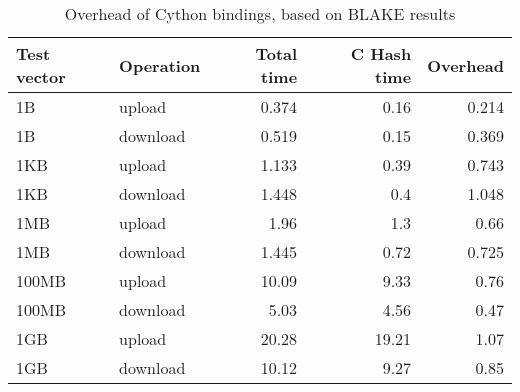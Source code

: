 \begin{table}
  \centering
  \begin{tabular}{ | l | l | r | r | r |}
    \hline
    \textbf{Test vector} & \textbf{Operation} & \textbf{Total time} & \textbf{C Hash time} & \textbf{Overhead} \\ \hline
    1B     &  upload    &  0.374  &  0.16   &  0.214  \\  \hline
    1B     &  download  &  0.519  &  0.15   &  0.369  \\  \hline
    1KB    &  upload    &  1.133  &  0.39   &  0.743  \\  \hline
    1KB    &  download  &  1.448  &  0.4    &  1.048  \\  \hline
    1MB    &  upload    &  1.96   &  1.3    &  0.66   \\  \hline
    1MB    &  download  &  1.445  &  0.72   &  0.725  \\  \hline
    100MB  &  upload    &  10.09  &  9.33   &  0.76   \\  \hline
    100MB  &  download  &  5.03   &  4.56   &  0.47   \\  \hline
    1GB    &  upload    &  20.28  &  19.21  &  1.07   \\  \hline
    1GB    &  download  &  10.12  &  9.27   &  0.85   \\  \hline

  \end{tabular}
  \caption{Overhead of Cython bindings, based on BLAKE results}
  \label{tbl:cython:overhead}
\end{table}
